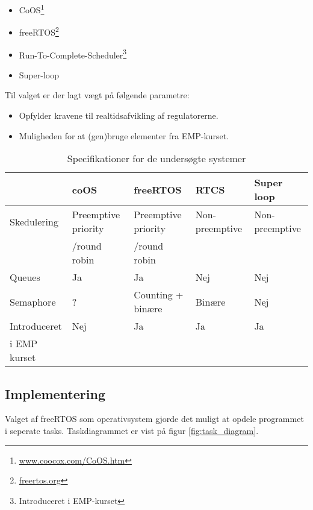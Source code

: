 \begin{itemize}
\itemsep1pt
	\item CoOS\footnote{\url{www.coocox.com/CoOS.htm}} 
	\item freeRTOS\footnote{\url{freertos.org}}
	\item Run-To-Complete-Scheduler\footnote{Introduceret i EMP-kurset}
	\item Super-loop
\end{itemize}

Til valget er der lagt vægt på følgende parametre: 

\begin{itemize}
\itemsep1pt
	\item Opfylder kravene til realtidsafvikling af regulatorerne. 
	\item Muligheden for at (gen)bruge elementer fra EMP-kurset.
\end{itemize}

\begin{table}[h!]
\begin{tabular}{|l|l|l|l|l|}
\hline 
 & coOS & freeRTOS & RTCS & Super loop \\ 
\hline 
Skedulering & Preemptive priority  & Preemptive priority  & Non-preemptive & Non-preemptive  \\ 
			& /round robin		&	/round robin & &	\\
\hline 
Queues & Ja & Ja & Nej & Nej \\ 
\hline 
Semaphore & ?  & Counting + binære & Binære  & Nej  \\ 
\hline 
Introduceret & Nej & Ja & Ja & Ja \\ 
i EMP kurset &   &   &   &   \\
\hline 
\end{tabular} 
\caption{Specifikationer for de undersøgte systemer}
\label{tb:os_comparison}
\end{table}
%
\subsection{Implementering}
% 
% 

Valget af freeRTOS som operativsystem gjorde det muligt at opdele programmet i seperate tasks. Taskdiagrammet er vist på figur \ref{fig:task_diagram}. 

